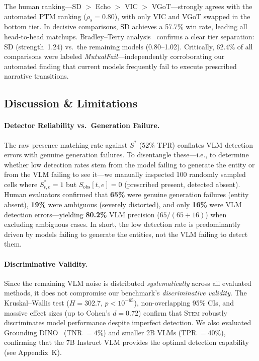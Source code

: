 \documentclass[sigconf,review,anonymous]{acmart}
\theoremstyle{definition}
\newcommand{\stem}{\textsc{Stem}}
\begin{document}
The human ranking---SD $>$ Echo $>$ VIC $>$ VGoT---strongly agrees with the automated PTM ranking ($\rho_s = 0.80$), with only VIC and VGoT swapped in the bottom tier. In decisive comparisons, SD achieves a 57.7\% win rate, leading all head-to-head matchups. Bradley--Terry analysis~\cite{bradleyterry} confirms a clear tier separation: SD (strength~1.24) vs.\ the remaining models (0.80--1.02). Critically, 62.4\% of all comparisons were labeled \emph{MutualFail}---independently corroborating our automated finding that current models frequently fail to execute prescribed narrative transitions.

\subsection{Discussion \& Limitations}
\label{sec:discussion}

\paragraph{Detector Reliability vs.\ Generation Failure.}
The raw presence matching rate against $S^*$ (52\% TPR) conflates VLM detection errors with genuine generation failures. To disentangle these---i.e., to determine whether low detection rates stem from the model failing to generate the entity or from the VLM failing to see it---we manually inspected 100 randomly sampled cells where $S^*_{t,e} = 1$ but $S_\text{obs}[t,e] = 0$ (prescribed present, detected absent). Human evaluators confirmed that \textbf{65\%} were genuine generation failures (entity absent), \textbf{19\%} were ambiguous (severely distorted), and only \textbf{16\%} were VLM detection errors---yielding \textbf{80.2\%} VLM precision ($65/(65{+}16)$) when excluding ambiguous cases. In short, the low detection rate is predominantly driven by models failing to generate the entities, not the VLM failing to detect them.

\paragraph{Discriminative Validity.}
Since the remaining VLM noise is distributed \emph{systematically} across all evaluated methods, it does not compromise our benchmark's \emph{discriminative validity}. The Kruskal--Wallis test ($H = 302.7$, $p < 10^{-65}$), non-overlapping 95\% CIs, and massive effect sizes (up to Cohen's $d = 0.72$) confirm that \stem{} robustly discriminates model performance despite imperfect detection. We also evaluated Grounding DINO~\cite{groundingdino} (TNR $= 4\%$) and smaller 2B VLMs (TPR $= 40\%$), confirming that the 7B Instruct VLM provides the optimal detection capability (see Appendix~K).
\end{document}
